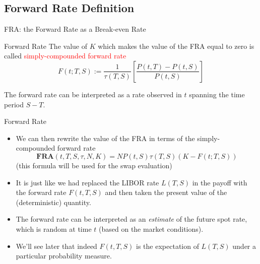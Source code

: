 \documentclass{beamer}
\begin{document}
\subsection{Forward Rate Definition}
\begin{frame}{FRA: the Forward Rate as a Break-even Rate}
	\begin{block}{Forward Rate}
		The value of $K$ which makes the value of the FRA equal to zero is called \textcolor{red}{simply-compounded forward rate}
		\begin{equation}
			F(t;T,S):=\frac{1}{\tau(T,S)}\left[\frac{P(t,T)-P(t,S)}{P(t,S)}\right]
		\end{equation}
	\end{block}
	
	The forward rate can be interpreted as a rate observed in $t$ spanning the time period $S-T$.
	
	
\end{frame}

\begin{frame}{Forward Rate}
	\begin{itemize}
		\item We can then rewrite the value of the FRA in terms of the simply-compounded forward rate
		\begin{equation}
			\mathbf{FRA}(t,T,S,\tau,N,K)=NP(t,S)\tau(T,S)(K-F(t;T,S))
			\label{eq:fram_payoff_withF}
		\end{equation}
		(this formula will be used for the swap evaluation)
		\item It is just like we had replaced the LIBOR rate $L(T,S)$ in the payoff with the forward rate $F(t,T,S)$ and then taken the present value of the (deterministic) quantity.
		\item The forward rate can be interpreted as an \emph{estimate} of the future spot rate, which is random at time $t$ (based on the market conditions).
		\item We'll see later that indeed $F(t,T,S)$ is the expectation of $L(T,S)$ under a particular probability measure.
	\end{itemize}
\end{frame}
\end{document}
